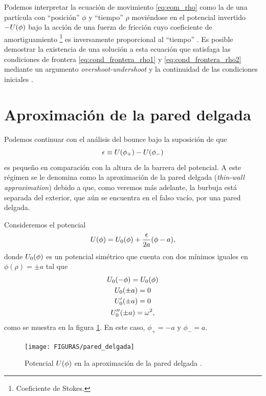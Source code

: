 Podemos interpretar la ecuación de movimiento \eqref{eq:eom_rho} como la de una partícula con ``posición'' $\phi$ y ``tiempo'' $\rho$ moviéndose en el potencial invertido $-U\qty(\phi)$ bajo la acción de una fuerza de fricción cuyo coeficiente de amortiguamiento \footnote{Coeficiente de Stokes.} es inversamente proporcional al ``tiempo'' \cite{weinberg2012classical}. 
Es posible demostrar la existencia de una solución a esta ecuación que satisfaga las condiciones de frontera \eqref{eq:cond_frontera_rho1} y \eqref{eq:cond_frontera_rho2} mediante un argumento \emph{overshoot-undershoot} y la continuidad de las condiciones iniciales  \cite{coleman1977fate}.
%

\section{Aproximación de la pared delgada}

Podemos continuar con el análisis del bounce bajo la suposición de que 
\begin{equation}
	\epsilon \equiv U\qty(\phi_+) - U\qty(\phi_-)
\end{equation}
es pequeño en comparación con la altura de la barrera del potencial. A este régimen se le denomina como la aproximación de la pared delgada (\emph{thin-wall approximation}) debido a que, como veremos más adelante, la burbuja está separada del exterior, que aún se encuentra en el falso vacío, por una pared delgada. 

Consideremos el potencial
\begin{equation} \label{eq:potencial_tw}
U\qty(\phi) = U_0\qty(\phi) + \frac{\epsilon}{2a}\qty(\phi - a),
\end{equation} 
donde $U_0\qty(\phi)$ es un potencial simétrico
que cuenta con dos mínimos iguales en $\phi(\rho) = \pm a$ tal que
\begin{gather}
U_0\qty(-\phi) = U_0\qty(\phi) \\
U_0 \qty(\pm a) = 0 \\
U'_0 \qty(\pm a) = 0 \\
U''_0 \qty(\pm a) = \omega^2,
\end{gather}
como se muestra en la figura \ref{fig:pareddelgada}. En este caso, $\phi_+ = -a$ y $\phi_- = a$. 
\begin{figure}[t]
	\centering
	\texttt{[image: FIGURAS/pared\_delgada]}
	\caption{Potencial $U\qty(\phi)$ en la aproximación de la pared delgada \cite{paranjape2017theory}.}
	\label{fig:pareddelgada}
\end{figure}

